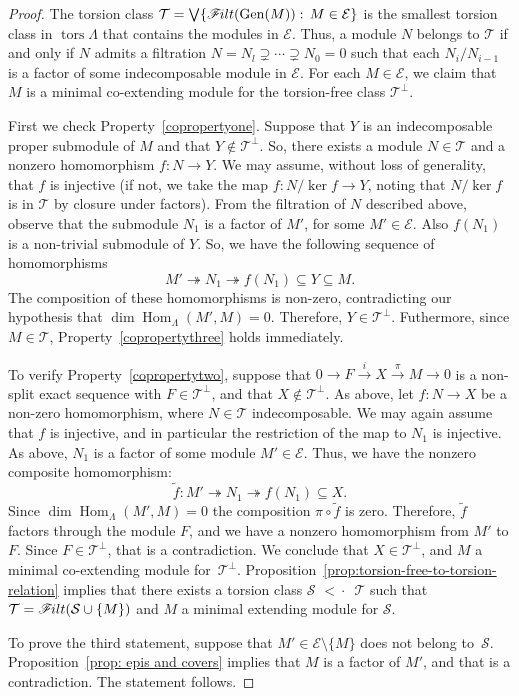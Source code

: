 \documentclass[10pt]{amsart}
\providecommand{\1}{}
\DeclareMathOperator{\tors}{tors}
\DeclareMathOperator{\Hom}{Hom}
\newcommand{\calE}{\mathcal{E}}
\newcommand{\calS}{\mathcal{S}}
\newcommand{\calT}{\mathcal{T}}
\newcommand{\onto}{\twoheadrightarrow}
\newcommand{\filt}{\mathscr{F}\Mk ilt}
\newcommand{\covered}{{\,\,<\!\!\!\!\cdot\,\,\,}}
\renewcommand{\Join}{\bigvee}
\newcommand{\Gen}{\operatorname{Gen}}
\renewcommand{\1}{\hat{1}}
\newcommand{\0}{\hat{0}}
\newcommand*{\Mk}{\mkern -2mu}
\theoremstyle{definition}
\begin{document}
\begin{proof}
The torsion class $\calT=\Join \{\filt(\Gen(M)):\, M\in \calE\}$ is the smallest torsion class in $\tors \Lambda$ that contains the modules in $\calE$.
Thus, a module $N$ belongs to $\calT$ if and only if $N$ admits a filtration $N=N_l \supsetneq \cdots
 \supsetneq N_0=0$ such that each $N_i/N_{i-1}$ is a factor of some indecomposable module in $\calE$.
For each $M\in \calE$, we claim that $M$ is a minimal co-extending module for the torsion-free class $\calT^\perp$.

First we check Property~\ref{copropertyone}.
Suppose that $Y$ is an indecomposable proper submodule of $M$ and that $Y\notin \calT^\perp$.
So, there exists a module $N\in \calT$ and a nonzero homomorphism $f: N\rightarrow Y$.
We may assume, without loss of generality, that $f$ is injective (if not, we take the map $f:N/\ker f\rightarrow Y$, noting that $N/\ker f$ is in $\calT$ by closure under factors).
From the filtration of $N$ described above, observe that the submodule $N_1$ is a factor of $M'$, for some $M'\in \calE$.
Also $f(N_1)$ is a non-trivial submodule of $Y$.
So, we have the following sequence of homomorphisms \[ M' \onto N_1 \onto f(N_1) \subseteq Y\subseteq M.\]
The composition of these homomorphisms is non-zero, contradicting our hypothesis that $\dim \Hom_\Lambda (M', M) = 0$.
Therefore, $Y\in \calT^\perp$.
Futhermore, since $M\in \calT$, Property~\ref{copropertythree} holds immediately.

To verify Property~\ref{copropertytwo}, suppose that $0 \rightarrow F \xrightarrow{i} X \xrightarrow{\pi} M \rightarrow 0$ is a non-split exact sequence with $F\in \calT^\perp$, and that $X\notin \calT^\perp$.
As above, let $f: N\rightarrow X$ be a non-zero homomorphism, where $N\in \calT$ indecomposable.
We may again assume that $f$ is injective, and in particular the restriction of the map to $N_1$ is injective.
As above, $N_1$ is a factor of some module $M'\in\calE$.
Thus, we have the nonzero composite homomorphism:
\[\tilde{f}: M' \onto N_1 \onto f(N_1) \subseteq X.\]
Since $\dim \Hom_{\Lambda}(M', M) =0$ the composition $\pi\circ \tilde{f}$ is zero.
Therefore, $\tilde{f}$ factors through the module $F$, and we have a nonzero homomorphism from $M'$ to $F$.
Since $F\in \calT^\perp$, that is a contradiction.
We conclude that $X\in \calT^\perp$, and $M$ a minimal co-extending module for~$\calT^\perp$.
Proposition~\ref{prop:torsion-free-to-torsion-relation} implies that there exists a torsion class $\calS\covered \calT$ such that $\calT= \filt(\calS \cup \{M\})$ and $M$ a minimal extending module for $\calS$.

To prove the third statement, suppose that $M'\in \calE\setminus \{M\}$ does not belong to~$\calS$.
Proposition~\ref{prop: epis and covers} implies that $M$ is a factor of $M'$, and that is a contradiction.
The statement follows.
\end{proof}
\end{document}
